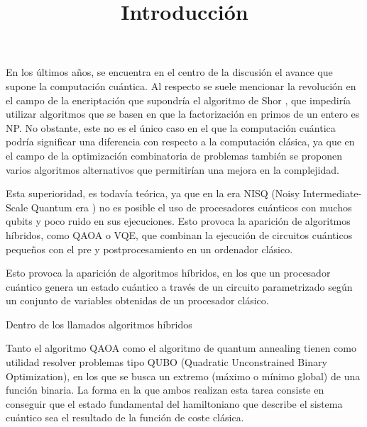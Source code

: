 \documentclass{article}
\title{Introducción}
\begin{document}
\maketitle{}
\tableofcontents{}

\newpage

En los últimos años, se encuentra en el centro de la discusión el avance que supone la computación cuántica. Al respecto se suele mencionar la revolución en el campo de la encriptación que supondría el algoritmo de Shor \cite{Shor_algorithm}, que impediría utilizar algoritmos que se basen en que la factorización en primos de un entero es NP. No obstante, este no es el único caso en el que la computación cuántica podría significar una diferencia con respecto a la computación clásica, ya que en el campo de la optimización combinatoria  %
de problemas también se proponen varios algoritmos alternativos que permitirían una mejora en la complejidad.

Esta superioridad, es todavía teórica, ya que en la era NISQ (Noisy Intermediate-Scale Quantum era \cite{Quantum_computing_in_the_NISQ_era_and_beyond}) no es posible el uso de procesadores cuánticos con muchos qubits y poco ruido  %
en sus ejecuciones. Esto provoca la aparición de algoritmos híbridos, como QAOA \cite{qaoa_paper_original} o VQE, que combinan la ejecución de circuitos cuánticos pequeños con el pre y postprocesamiento en un ordenador clásico.

Esto provoca la aparición de algoritmos híbridos, en los que un procesador cuántico genera un estado cuántico a través de un circuito parametrizado según un conjunto de variables obtenidas de un procesador clásico.

Dentro de los llamados algoritmos híbridos



Tanto el algoritmo QAOA como el algoritmo de quantum annealing tienen como utilidad resolver problemas tipo QUBO (Quadratic Unconstrained Binary Optimization), en los que se busca un extremo (máximo o mínimo global) de una función binaria. La forma en la que ambos realizan esta tarea consiste en conseguir que el estado fundamental  %
 del hamiltoniano que describe el sistema cuántico sea el resultado de la función de coste clásica.
\end{document}
